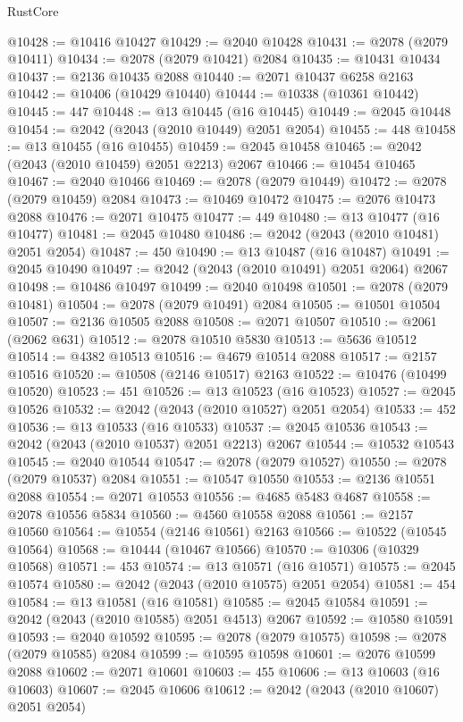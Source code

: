 \begin{lexlean}{RustCore}
\begin{coremodule}
@10428 := @10416 @10427
@10429 := @2040 @10428
@10431 := @2078 (@2079 @10411)
@10434 := @2078 (@2079 @10421) @2084
@10435 := @10431 @10434
@10437 := @2136 @10435 @2088
@10440 := @2071 @10437 @6258 @2163
@10442 := @10406 (@10429 @10440)
@10444 := @10338 (@10361 @10442)
@10445 := 447
@10448 := @13 @10445 (@16 @10445)
@10449 := @2045 @10448
@10454 := @2042 (@2043 (@2010 @10449) @2051 @2054)
@10455 := 448
@10458 := @13 @10455 (@16 @10455)
@10459 := @2045 @10458
@10465 := @2042 (@2043 (@2010 @10459) @2051 @2213) @2067
@10466 := @10454 @10465
@10467 := @2040 @10466
@10469 := @2078 (@2079 @10449)
@10472 := @2078 (@2079 @10459) @2084
@10473 := @10469 @10472
@10475 := @2076 @10473 @2088
@10476 := @2071 @10475
@10477 := 449
@10480 := @13 @10477 (@16 @10477)
@10481 := @2045 @10480
@10486 := @2042 (@2043 (@2010 @10481) @2051 @2054)
@10487 := 450
@10490 := @13 @10487 (@16 @10487)
@10491 := @2045 @10490
@10497 := @2042 (@2043 (@2010 @10491) @2051 @2064) @2067
@10498 := @10486 @10497
@10499 := @2040 @10498
@10501 := @2078 (@2079 @10481)
@10504 := @2078 (@2079 @10491) @2084
@10505 := @10501 @10504
@10507 := @2136 @10505 @2088
@10508 := @2071 @10507
@10510 := @2061 (@2062 @631)
@10512 := @2078 @10510 @5830
@10513 := @5636 @10512
@10514 := @4382 @10513
@10516 := @4679 @10514 @2088
@10517 := @2157 @10516
@10520 := @10508 (@2146 @10517) @2163
@10522 := @10476 (@10499 @10520)
@10523 := 451
@10526 := @13 @10523 (@16 @10523)
@10527 := @2045 @10526
@10532 := @2042 (@2043 (@2010 @10527) @2051 @2054)
@10533 := 452
@10536 := @13 @10533 (@16 @10533)
@10537 := @2045 @10536
@10543 := @2042 (@2043 (@2010 @10537) @2051 @2213) @2067
@10544 := @10532 @10543
@10545 := @2040 @10544
@10547 := @2078 (@2079 @10527)
@10550 := @2078 (@2079 @10537) @2084
@10551 := @10547 @10550
@10553 := @2136 @10551 @2088
@10554 := @2071 @10553
@10556 := @4685 @5483 @4687
@10558 := @2078 @10556 @5834
@10560 := @4560 @10558 @2088
@10561 := @2157 @10560
@10564 := @10554 (@2146 @10561) @2163
@10566 := @10522 (@10545 @10564)
@10568 := @10444 (@10467 @10566)
@10570 := @10306 (@10329 @10568)
@10571 := 453
@10574 := @13 @10571 (@16 @10571)
@10575 := @2045 @10574
@10580 := @2042 (@2043 (@2010 @10575) @2051 @2054)
@10581 := 454
@10584 := @13 @10581 (@16 @10581)
@10585 := @2045 @10584
@10591 := @2042 (@2043 (@2010 @10585) @2051 @4513) @2067
@10592 := @10580 @10591
@10593 := @2040 @10592
@10595 := @2078 (@2079 @10575)
@10598 := @2078 (@2079 @10585) @2084
@10599 := @10595 @10598
@10601 := @2076 @10599 @2088
@10602 := @2071 @10601
@10603 := 455
@10606 := @13 @10603 (@16 @10603)
@10607 := @2045 @10606
@10612 := @2042 (@2043 (@2010 @10607) @2051 @2054)

\end{coremodule}
\end{lexlean}
